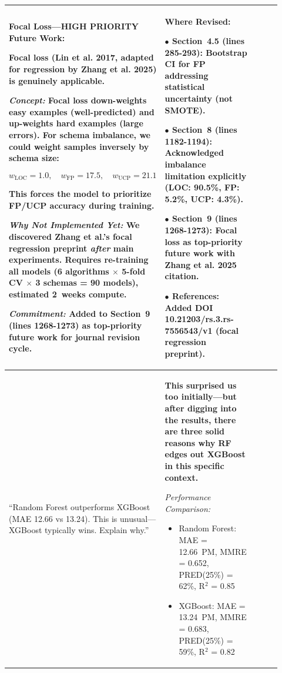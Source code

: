 \documentclass[11pt,a4paper]{article}
\begin{document}
\begin{longtable}{>{\raggedright\arraybackslash}p{0.26\linewidth}|>{\raggedright\arraybackslash}p{0.44\linewidth}|>{\raggedright\arraybackslash}p{0.22\linewidth}}
\textbf{Focal Loss---HIGH PRIORITY Future Work:}

Focal loss (Lin et al. 2017, adapted for regression by Zhang et al. 2025) is \textbf{genuinely applicable}.

\textit{Concept:} Focal loss down-weights easy examples (well-predicted) and up-weights hard examples (large errors). For schema imbalance, we could weight samples inversely by schema size:

$$w_{\text{LOC}} = 1.0, \quad w_{\text{FP}} = 17.5, \quad w_{\text{UCP}} = 21.1$$

This forces the model to prioritize FP/UCP accuracy during training.

\textit{Why Not Implemented Yet:} We discovered Zhang et al.'s focal regression preprint \textit{after} main experiments. Requires re-training all models (6 algorithms $\times$ 5-fold CV $\times$ 3 schemas = 90 models), estimated 2~weeks compute.

\textit{Commitment:} Added to Section~9 (lines 1268-1273) as \textbf{top-priority} future work for journal revision cycle. &

\textbf{Where Revised:}

$\bullet$ \textbf{Section~4.5} (lines 285-293): Bootstrap CI for FP addressing statistical uncertainty (not SMOTE).

$\bullet$ \textbf{Section~8} (lines 1182-1194): Acknowledged imbalance limitation explicitly (LOC: 90.5\%, FP: 5.2\%, UCP: 4.3\%).

$\bullet$ \textbf{Section~9} (lines 1268-1273): Focal loss as top-priority future work with Zhang et al. 2025 citation.

$\bullet$ \textbf{References}: Added DOI 10.21203/rs.3.rs-7556543/v1 (focal regression preprint). \\

\midrule

``Random Forest outperforms XGBoost (MAE 12.66 vs 13.24). This is unusual---XGBoost typically wins. Explain why.'' &

\textbf{This surprised us too initially---but after digging into the results, there are three solid reasons why RF edges out XGBoost in this specific context.}

\textit{Performance Comparison:}

\begin{itemize}
    \item Random Forest: MAE = 12.66~PM, MMRE = 0.652, PRED(25\%) = 62\%, R$^2$ = 0.85
    \item XGBoost: MAE = 13.24~PM, MMRE = 0.683, PRED(25\%) = 59\%, R$^2$ = 0.82
\end{itemize}


\end{longtable}
\end{document}
